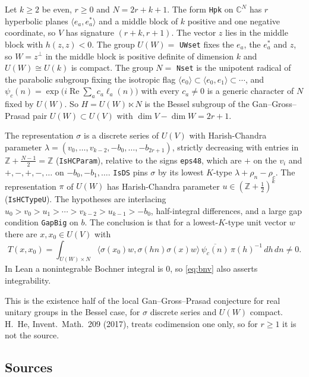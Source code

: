 \documentclass[11pt]{article}
\newcommand{\lean}[1]{\nolinkurl{#1}}
\theoremstyle{definition}
\begin{document}
Let $k\ge2$ be even, $r\ge0$ and $N=2r+k+1$. The form \lean{Hpk} on $\mathbb C^N$ has $r$ hyperbolic planes $\langle e_a,e_a^*\rangle$ and a middle block of $k$ positive and one negative coordinate, so $V$ has signature $(r+k,r+1)$. The vector $z$ lies in the middle block with $h(z,z)<0$. The group $U(W)=$ \lean{UWset} fixes the $e_a$, the $e_a^*$ and $z$, so $W=z^\perp$ in the middle block is positive definite of dimension $k$ and $U(W)\cong U(k)$ is compact. The group $N=$ \lean{Nset} is the unipotent radical of the parabolic subgroup fixing the isotropic flag $\langle e_0\rangle\subset\langle e_0,e_1\rangle\subset\cdots$, and $\psi_c(n)=\exp\bigl(i\operatorname{Re}\sum_ac_a\ell_a(n)\bigr)$ with every $c_a\ne0$ is a generic character of $N$ fixed by $U(W)$. So $H=U(W)\ltimes N$ is the Bessel subgroup of the Gan--Gross--Prasad pair $U(W)\subset U(V)$ with $\dim V-\dim W=2r+1$.

The representation $\sigma$ is a discrete series of $U(V)$ with Harish-Chandra parameter $\lambda=(v_0,\dots,v_{k-2},-b_0,\dots,-b_{2r+1})$, strictly decreasing with entries in $\mathbb Z+\frac{N-1}2=\mathbb Z$ (\lean{IsHCParam}), relative to the signs \lean{eps48}, which are $+$ on the $v_i$ and $+,-,+,-,\dots$ on $-b_0,-b_1,\dots$. \lean{IsDS} pins $\sigma$ by its lowest $K$-type $\lambda+\rho_n-\rho_c$. The representation $\pi$ of $U(W)$ has Harish-Chandra parameter $u\in(\mathbb Z+\frac12)^k$ (\lean{IsHCTypeU}). The hypotheses are interlacing $u_0>v_0>u_1>\cdots>v_{k-2}>u_{k-1}>-b_0$, half-integral differences, and a large gap condition \lean{GapBig} on $b$. The conclusion is that for a lowest-$K$-type unit vector $w$ there are $x,x_0\in U(V)$ with
\begin{equation}\label{eq:bnv}
T(x,x_0)=\int_{U(W)\times N}\langle\sigma(x_0)w,\sigma(hn)\sigma(x)w\rangle\,\overline{\psi_c(n)}\,\pi(h)^{-1}\,dh\,dn\ne0 .
\end{equation}
In Lean a nonintegrable Bochner integral is $0$, so \eqref{eq:bnv} also asserts integrability.

This is the existence half of the local Gan--Gross--Prasad conjecture for real unitary groups in the Bessel case, for $\sigma$ discrete series and $U(W)$ compact. H.~He, Invent.\ Math.\ 209 (2017), treats codimension one only, so for $r\ge1$ it is not the source.

\subsection{Sources}
\end{document}
